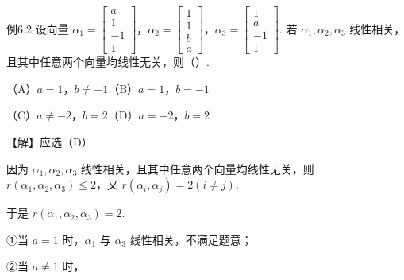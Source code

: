 \begin{fcard}{例6.2}
设向量 $\alpha_1=\begin{bmatrix}a\\1\\-1\\1\end{bmatrix}$，$\alpha_2=\begin{bmatrix}1\\1\\b\\a\end{bmatrix}$，$\alpha_3=\begin{bmatrix}1\\a\\-1\\1\end{bmatrix}$. 若 $\alpha_1,\alpha_2,\alpha_3$ 线性相关，且其中任意两个向量均线性无关，则（\quad）.

（A）$a=1$，$b\ne-1$\qquad（B）$a=1$，$b=-1$

（C）$a\ne-2$，$b=2$\qquad（D）$a=-2$，$b=2$

【解】应选（D）.


因为 $\alpha_1,\alpha_2,\alpha_3$ 线性相关，且其中任意两个向量均线性无关，则 $r(\alpha_1,\alpha_2,\alpha_3)\le2$，又 $r(\alpha_i,\alpha_j)=2(i\ne j)$.

于是 $r(\alpha_1,\alpha_2,\alpha_3)=2$.

①当 $a=1$ 时，$\alpha_1$ 与 $\alpha_3$ 线性相关，不满足题意；

②当 $a\ne1$ 时，



\end{fcard}
